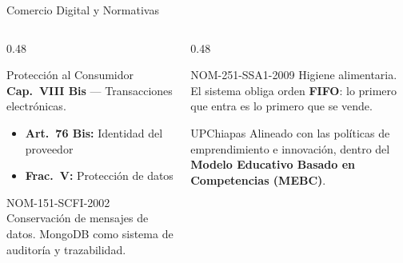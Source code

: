 \documentclass[aspectratio=169, 12pt]{beamer}
\newcommand{\tag}[1]{%
  \tikz[baseline=(t.base)]{\node[fill=bg2, draw=yellow1!30, text=yellow1,
  rounded corners=8pt, inner xsep=6pt, inner ysep=2pt,
  font=\tiny\bfseries] (t) {\MakeUppercase{#1}};}%
}
\begin{document}
\begin{frame}{\tag{Marco Legal} \; Comercio Digital y {\color{red1}Normativas}}
\vspace{4pt}
\begin{columns}[T]
\begin{column}{0.48\textwidth}
\begin{block}{Protecci\'on al Consumidor}
\small \textbf{Cap.\ VIII Bis} --- Transacciones electr\'onicas.
\begin{itemize}\small
  \item \textbf{Art.\ 76 Bis:} Identidad del proveedor
  \item \textbf{Frac.\ V:} Protecci\'on de datos
\end{itemize}
\end{block}
\vspace{2pt}
\begin{block}{NOM-151-SCFI-2002}
\small Conservaci\'on de mensajes de datos. MongoDB como sistema de auditor\'ia y trazabilidad.
\end{block}
\end{column}
\begin{column}{0.48\textwidth}
\begin{block}{NOM-251-SSA1-2009}
\small Higiene alimentaria. El sistema obliga orden \textbf{FIFO}: lo primero que entra es lo primero que se vende.
\end{block}
\vspace{2pt}
\begin{alertblock}{UPChiapas}
\small Alineado con las pol\'iticas de emprendimiento e innovaci\'on, dentro del \textbf{Modelo Educativo Basado en Competencias (MEBC)}.
\end{alertblock}
\end{column}
\end{columns}
\end{frame}
\end{document}

